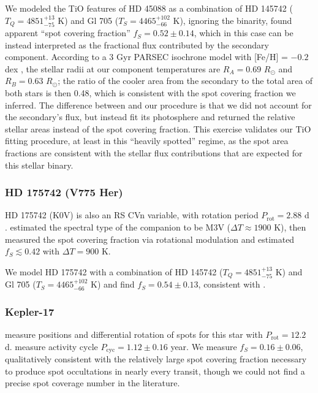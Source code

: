 We modeled the TiO features of HD 45088 as a combination of HD 145742 ($T_Q=4851^{+13}_{-75}$ K) and Gl 705 ($T_S = 4465^{+102}_{-66}$ K), 
ignoring the binarity, found apparent ``spot covering fraction'' $f_S = 0.52 \pm 0.14$, which in this case can be instead interpreted as the fractional flux contributed by the secondary component.
According to a 3 Gyr PARSEC isochrone model with [Fe/H] = $-0.2$ dex \citep{Bressan2012}, 
the stellar radii at our component temperatures are 
$R_A = 0.69$ $R_\odot$ and 
$R_B = 0.63$ $R_\odot$;
the ratio of the cooler area from the secondary to the total area 
of both stars is then 0.48, which 
is consistent with the spot covering fraction we inferred. 
The difference between \citet{ONeal2001} and our procedure is that we did not account for the secondary's flux, but instead 
fit its photosphere and returned the relative stellar areas instead of the spot covering fraction. This exercise validates our TiO fitting procedure, 
at least in this ``heavily spotted'' regime,
as the spot area fractions are consistent with the stellar flux contributions that are expected for this stellar binary.


\subsubsection{HD 175742 (V775 Her)}

HD 175742 (K0V) is also an RS CVn variable, with rotation period $P_\mathrm{rot} = 2.88$ d \citep{Rutten1987}. \citet{Alekseev2000} 
estimated the spectral type of the companion to be M3V 
($\Delta T \approx 1900$ K), 
then measured the spot covering fraction via rotational modulation and estimated $f_S \lesssim 0.42$ with $\Delta T = 900$ K. 

We model HD 175742 with a combination of HD 145742 ($T_Q = 4851^{+13}_{-75}$ K) and Gl 705 ($T_S = 4465^{+102}_{-66}$ K) and find $f_S = 0.54 \pm 0.13$, consistent with \citet{Alekseev2000}.


\subsubsection{Kepler-17}

\citet{Desert2011, Bonomo2012, davenportthesis} measure positions and differential rotation of spots for this star with $P_\mathrm{rot} = 12.2$ d. \citet{Estrela2016} measure activity cycle $P_\mathrm{cyc} = 1.12 \pm 0.16$ year. We measure $f_S = 0.16 \pm 0.06$, qualitatively consistent with the relatively large spot covering fraction necessary to produce spot occultations in nearly every transit, though we could not find a precise spot coverage number in the literature.


